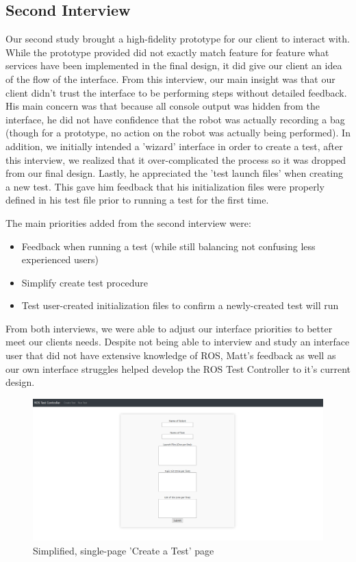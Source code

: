 \documentclass[onecolumn, draftclsnofoot,10pt, compsoc]{IEEEtran}
\begin{document}
\subsection{Second Interview}
Our second study brought a high-fidelity prototype for our client to interact with. While the prototype provided did not exactly match feature for feature what services have been implemented in the final design, it did give our client an idea of the flow of the interface.
From this interview, our main insight was that our client didn't trust the interface to be performing steps without detailed feedback. His main concern was that because all console output was hidden from the interface, he did not have confidence that the robot was actually recording a bag (though for a prototype, no action on the robot was actually being performed). In addition, we initially intended a 'wizard' interface in order to create a test, after this interview, we realized that it over-complicated the process so it was dropped from our final design. Lastly, he appreciated the 'test launch files' when creating a new test. This gave him feedback that his initialization files were properly defined in his test file prior to running a test for the first time. 

The main priorities added from the second interview were:
\begin{itemize}
	\item Feedback when running a test (while still balancing not confusing less experienced users)
	\item Simplify create test procedure
	\item Test user-created initialization files to confirm a newly-created test will run
\end{itemize}

From both interviews, we were able to adjust our interface priorities to better meet our clients needs. Despite not being able to interview and study an interface user that did not have extensive knowledge of ROS, Matt's feedback as well as our own interface struggles helped develop the ROS Test Controller to it's current design. 

\begin{figure}[h]
	\centering
	\includegraphics[width=0.6\linewidth]{"Current Create Test"}
	\caption{Simplified, single-page 'Create a Test' page}
	\label{fig:current-create-test}
\end{figure}
\end{document}
